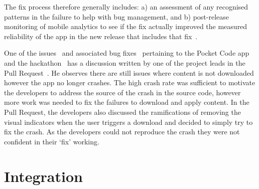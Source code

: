The fix process therefore generally includes: a) an assessment of any recognised patterns in the failure to help with bug management, and b) post-release monitoring of mobile analytics to see if the fix actually improved the measured reliability of the app in the new release that includes that fix~. 

One of the issues~ and associated bug fixes~ pertaining to the Pocket Code app and the hackathon~ has a discussion written by one of the project leads in the Pull Request~. 
He observes there are still issues where content is not downloaded however the app no longer crashes. The high crash rate was sufficient to motivate the developers to address the source of the crash in the source code, however more work was needed to fix the failures to download and apply content. In the Pull Request, the developers also discussed the ramifications of removing the visual indicators when the user triggers a download and decided to simply try to fix the crash. As the developers could not reproduce the crash they were not confident in their `fix' working.

\section{Integration}~\label{aiu-integration-section}

